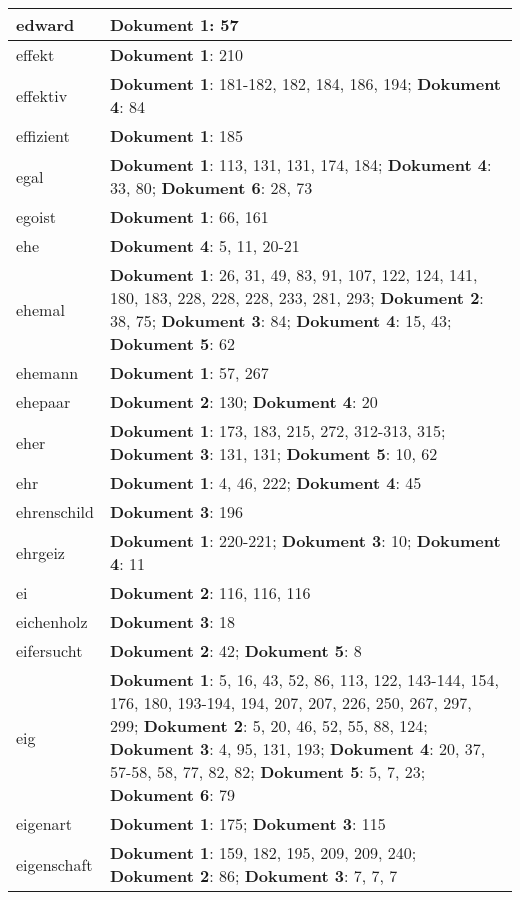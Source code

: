 \documentclass[a5paper]{article}
\begin{document}
\begin{longtable}[l]{|l|p{3in}|}
\hline
edward & \textbf{Dokument 1}: 57 \\
\hline
effekt & \textbf{Dokument 1}: 210 \\
\hline
effektiv & \textbf{Dokument 1}: 181-182, 182, 184, 186, 194; \textbf{Dokument 4}: 84 \\
\hline
effizient & \textbf{Dokument 1}: 185 \\
\hline
egal & \textbf{Dokument 1}: 113, 131, 131, 174, 184; \textbf{Dokument 4}: 33, 80; \textbf{Dokument 6}: 28, 73 \\
\hline
egoist & \textbf{Dokument 1}: 66, 161 \\
\hline
ehe & \textbf{Dokument 4}: 5, 11, 20-21 \\
\hline
ehemal & \textbf{Dokument 1}: 26, 31, 49, 83, 91, 107, 122, 124, 141, 180, 183, 228, 228, 228, 233, 281, 293; \textbf{Dokument 2}: 38, 75; \textbf{Dokument 3}: 84; \textbf{Dokument 4}: 15, 43; \textbf{Dokument 5}: 62 \\
\hline
ehemann & \textbf{Dokument 1}: 57, 267 \\
\hline
ehepaar & \textbf{Dokument 2}: 130; \textbf{Dokument 4}: 20 \\
\hline
eher & \textbf{Dokument 1}: 173, 183, 215, 272, 312-313, 315; \textbf{Dokument 3}: 131, 131; \textbf{Dokument 5}: 10, 62 \\
\hline
ehr & \textbf{Dokument 1}: 4, 46, 222; \textbf{Dokument 4}: 45 \\
\hline
ehrenschild & \textbf{Dokument 3}: 196 \\
\hline
ehrgeiz & \textbf{Dokument 1}: 220-221; \textbf{Dokument 3}: 10; \textbf{Dokument 4}: 11 \\
\hline
ei & \textbf{Dokument 2}: 116, 116, 116 \\
\hline
eichenholz & \textbf{Dokument 3}: 18 \\
\hline
eifersucht & \textbf{Dokument 2}: 42; \textbf{Dokument 5}: 8 \\
\hline
eig & \textbf{Dokument 1}: 5, 16, 43, 52, 86, 113, 122, 143-144, 154, 176, 180, 193-194, 194, 207, 207, 226, 250, 267, 297, 299; \textbf{Dokument 2}: 5, 20, 46, 52, 55, 88, 124; \textbf{Dokument 3}: 4, 95, 131, 193; \textbf{Dokument 4}: 20, 37, 57-58, 58, 77, 82, 82; \textbf{Dokument 5}: 5, 7, 23; \textbf{Dokument 6}: 79 \\
\hline
eigenart & \textbf{Dokument 1}: 175; \textbf{Dokument 3}: 115 \\
\hline
eigenschaft & \textbf{Dokument 1}: 159, 182, 195, 209, 209, 240; \textbf{Dokument 2}: 86; \textbf{Dokument 3}: 7, 7, 7 \\

\end{longtable}
\end{document}

